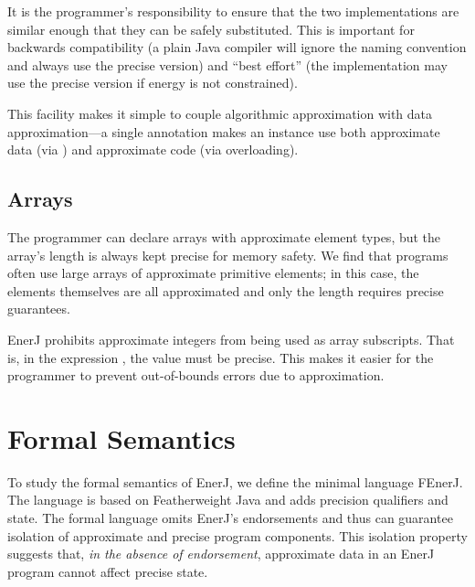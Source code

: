 It is the programmer's responsibility to ensure that the two
implementations are similar enough that they can be safely substituted.
This is important for backwards compatibility
(a plain Java compiler will ignore the naming convention and always
use the precise version) and ``best effort'' (the implementation may
use the precise version if energy is not constrained).

This facility makes it simple to couple algorithmic approximation with
data approximation---a single annotation makes an instance use both
approximate data (via ) and approximate code (via
overloading).

\subsection{Arrays}
The programmer can declare arrays with approximate element types, but
the array's length is always kept precise for memory safety.
We find that programs often
use large arrays of approximate primitive elements; in this case, the
elements themselves are all approximated and only the length requires
precise guarantees.

EnerJ prohibits approximate integers from being used as array
subscripts. That is, in the expression , the value  must
be precise. This makes it easier for the programmer to
prevent out-of-bounds errors due to approximation.




\section{Formal Semantics}
\label{enerj:semantics}
To study the formal semantics of EnerJ, we define the minimal language
FEnerJ. The language is based on Featherweight Java \cite{IgarashiEA01}
and adds precision qualifiers and state. The formal language omits
EnerJ's endorsements and thus can guarantee isolation of approximate and
precise program components. This isolation property suggests that,
\emph{in the absence of endorsement}, approximate data in an EnerJ program
cannot affect precise state.

